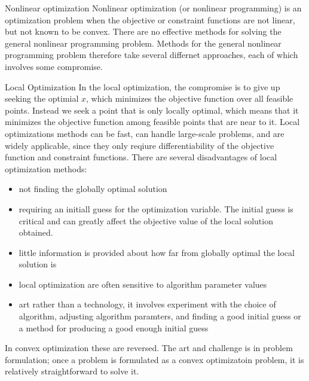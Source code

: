 \documentclass{beamer}
\begin{document}

\begin{frame}{Nonlinear optimization}
Nonlinear optimization (or nonlinear programming) is an optimization problem when the objective or constraint functions are not linear, but not known to be convex.
There are no effective methods for solving the general nonlinear programming problem.
Methods for the general nonlinear programming problem therefore take several differnet approaches, each of which involves some compromise.
\end{frame}


\begin{frame}{Local Optimization}
In the local optimization, the compromise is to give up seeking the optimial $x$, which minimizes the objective function over all feasible points. Instead we seek a point that is only locally optimal, which means that it minimizes the objective function among feasible points that are near to it.
Local optimizations methods can be fast, can handle large-scale problems, and are widely applicable, since they only reqiure differentiability of the objective function and constraint functions.
There are several disadvantages of local optimization methods:
\begin{itemize}
\item not finding the globally optimal solution
\item requiring an initiall guess for the optimization variable. The initial guess is critical and can greatly affect the objective value of the local solution obtained.
\item little information is provided about how far from globally optimal the local solution is
\item local optimization are often sensitive to algorithm parameter values
\item art rather than a technology, it involves experiment with the choice of algorithm, adjusting algorithm paramters, and finding a good initial guess or a method for producing a good enough initial guess
\end{itemize}
In convex optimization these are reversed. The art and challenge is in problem formulation; once a problem is formulated as a convex optimizatoin problem, it is relatively straightforward to solve it.
\end{frame}

\end{document}
